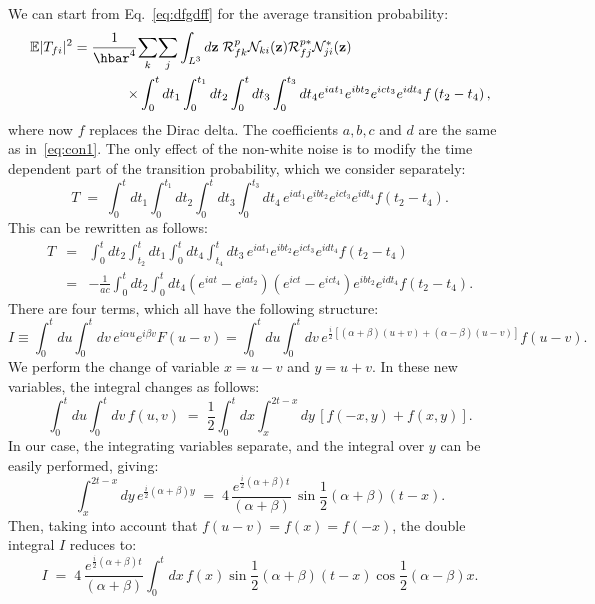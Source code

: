 \documentclass[12pt,onecolumn,amssymb,nofootinbib]{revtex4-2} %
\begin{document}
We can start from
Eq.~\eqref{eq:dfgdff} for the average transition probability:
\begin{eqnarray} \label{eq:dfgdffbis}
\lefteqn{\mathbb{E} |T_{fi}|^{2} =
\frac{1}{\hbar^{4}}\underset{k}{\sum}\underset{j}{\sum} \int_{L^3}
d\mathbf{z}\; {\mathcal R}_{fk}^{p} {\mathcal N}_{ki}(\mathbf{z})
{\mathcal R}_{fj}^{p*} {\mathcal N}_{ji}^{*}(\mathbf{z}) }
\qquad\qquad\qquad & & \\
& & \times \int_{0}^{t}dt_{1}\int_{0}^{t_{1}}dt_{2}\int_{0}^{t}dt_{3}\int_{0}^{t_{3}}dt_{4}
e^{iat_{1}}e^{ibt_{2}}e^{ict_{3}}e^{idt_{4}}f\left(t_{2}-t_{4}\right),
\nonumber
\end{eqnarray}
where now $f$ replaces the Dirac delta. The coefficients $a,b,c$ and $d$ are
the same as in~\eqref{eq:con1}. The only effect of the non-white noise is to
modify the time dependent part of the transition probability, which we consider
separately:
\begin{equation}
T \; = \; \int_{0}^{t}dt_{1}\int_{0}^{t_1}dt_{2}\int_{0}^{t}dt_{3}\int_{0}^{t_3}dt_{4}\,
e^{iat_{1}}e^{ibt_{2}}e^{ict_{3}}e^{idt_{4}}
f(t_{2}-t_{4}).
\end{equation}
This can be rewritten as follows:
\begin{eqnarray}
T & = & \int_{0}^{t}dt_{2}\int_{t_{2}}^{t}dt_{1}\int_{0}^{t}dt_{4}\int_{t_{4}}^{t}
dt_{3}\,e^{iat_{1}}e^{ibt_{2}}e^{ict_{3}}e^{idt_{4}}f\left(t_{2}-t_{4}\right) \nonumber \\
& = & -\frac{1}{ac}\int_{0}^{t}dt_{2}\int_{0}^{t}dt_{4}\left(e^{iat}-e^{iat_{2}}\right)
\left(e^{ict}-e^{ict_{4}}\right)e^{ibt_{2}}e^{idt_{4}}f\left(t_{2}-t_{4}\right).
\label{eq:op8pa}
\end{eqnarray}
There are four terms, which all have the following structure:
\begin{equation}
I \equiv \int_{0}^{t}du \int_{0}^{t}dv\, e^{i\alpha
u} e^{i\beta v} F(u-v) = \int_{0}^{t}du \int_{0}^{t}dv\, e^{\frac{i}{2}
\left[\left(\alpha+\beta\right)\left(u+v\right)+\left(\alpha-\beta\right)
\left(u-v\right)\right]}f\left(u-v\right).
\end{equation}
We perform the change of variable $x = u-v$ and $y = u+v$. In these new
variables, the integral changes as follows:
\begin{equation}
\int_{0}^{t}du \int_{0}^{t}dv\, f(u,v) \; = \; \frac{1}{2}\int_{0}^{t}dx
\int_{x}^{2t-x}dy\, \left[f(-x,y) + f(x,y)\right].
\end{equation}
In our case, the integrating variables separate, and the integral over $y$ can
be easily performed, giving:
\begin{equation}
\int_{x}^{2t-x}dy\, e^{\frac{i}{2}\left(\alpha+\beta\right)y} \; = \;
4 \, \frac{e^{\frac{i}{2}\left(\alpha+\beta\right)t}}{(\alpha+\beta)}\,
\sin{\frac{1}{2}(\alpha+\beta)(t-x)}.
\end{equation}
Then, taking into account that $f(u-v) = f(x) = f(-x)$, the double integral $I$
reduces to:
\begin{equation}
I \; = \; 4\, \frac{e^{\frac{i}{2}(\alpha+\beta)t}}{(\alpha+\beta)}
\int_{0}^{t}dx\, f(x) \sin\frac{1}{2}(\alpha+\beta)(t-x) \cos\frac{1}{2}(\alpha-\beta)x.
\end{equation}
\end{document}
